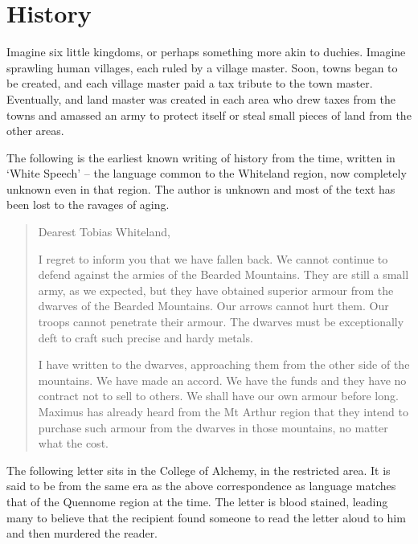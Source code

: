 \chapter{History}

\begin{multicols}{2}

Imagine six little kingdoms, or perhaps something more akin to duchies.  Imagine sprawling human villages, each ruled by a village master.  Soon, towns began to be created, and each village master paid a tax tribute to the town master.  Eventually, and land master was created in each area who drew taxes from the towns and amassed an army to protect itself or steal small pieces of land from the other areas.

	The following is the earliest known writing of history from the time, written in `White Speech' -- the language common to the Whiteland region, now completely unknown even in that region.  The author is unknown and most of the text has been lost to the ravages of aging.

\begin{quotation}
Dearest Tobias Whiteland,

I regret to inform you that we have fallen back.  We cannot continue to defend against the armies of the Bearded Mountains.  They are still a small army, as we expected, but they have obtained superior armour from the dwarves of the Bearded Mountains.  Our arrows cannot hurt them.  Our troops cannot penetrate their armour.  The dwarves must be exceptionally deft to craft such precise and hardy metals.

	I have written to the dwarves, approaching them from the other side of the mountains.  We have made an accord.  We have the funds and they have no contract not to sell to others.  We shall have our own armour before long.  Maximus has already heard from the Mt Arthur region that they intend to purchase such armour from the dwarves in those mountains, no matter what the cost.

\end{quotation}

The following letter sits in the College of Alchemy, in the restricted area.   It is said to be from the same era as the above correspondence as language matches that of the Quennome region at the time.  The letter is blood stained, leading many to believe that the recipient found someone to read the letter aloud to him and then murdered the reader.

\begin{quotation}


\end{quotation}
\end{multicols}
